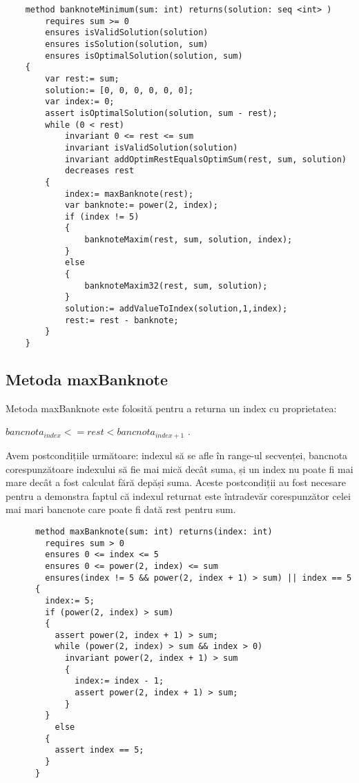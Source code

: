     \begin{lstlisting}
    method banknoteMinimum(sum: int) returns(solution: seq <int> )
        requires sum >= 0
        ensures isValidSolution(solution)
        ensures isSolution(solution, sum)
        ensures isOptimalSolution(solution, sum) 
    {
        var rest:= sum;
        solution:= [0, 0, 0, 0, 0, 0];
        var index:= 0;
        assert isOptimalSolution(solution, sum - rest);
        while (0 < rest)
            invariant 0 <= rest <= sum
            invariant isValidSolution(solution)
            invariant addOptimRestEqualsOptimSum(rest, sum, solution)
            decreases rest 
        {
            index:= maxBanknote(rest);
            var banknote:= power(2, index);
            if (index != 5) 
            {
                banknoteMaxim(rest, sum, solution, index);
            } 
            else 
            {
                banknoteMaxim32(rest, sum, solution);
            }
            solution:= addValueToIndex(solution,1,index);
            rest:= rest - banknote;
        }
    }
    \end{lstlisting}

    \subsection{Metoda maxBanknote}
    Metoda maxBanknote este folosită pentru a returna un index cu proprietatea: \par
     $bancnota_{index} <= rest < bancnota_{index + 1}$  .\par
     Avem postcondițiile următoare: indexul să se afle în range-ul secvenței, bancnota corespunzătoare indexului să fie mai mică decât suma,
     și un index nu poate fi mai mare decât a fost calculat fără depăși suma.
     Aceste postcondiții au fost necesare pentru a demonstra faptul că indexul returnat este întradevăr corespunzător celei
     mai mari bancnote care poate fi dată rest pentru sum.
    \begin{lstlisting}
      method maxBanknote(sum: int) returns(index: int)
        requires sum > 0
        ensures 0 <= index <= 5
        ensures 0 <= power(2, index) <= sum
        ensures(index != 5 && power(2, index + 1) > sum) || index == 5 
      {
        index:= 5;
        if (power(2, index) > sum) 
        {
          assert power(2, index + 1) > sum;
          while (power(2, index) > sum && index > 0)
            invariant power(2, index + 1) > sum 
            {
              index:= index - 1;
              assert power(2, index + 1) > sum;
            }
        } 
          else 
        {
          assert index == 5;
        }
      }
    \end{lstlisting}


